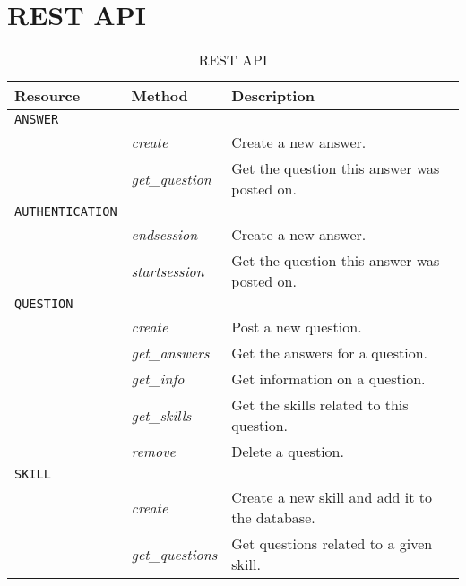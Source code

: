 \chapter{REST API}\label{app:rest}

\begin{table}
	\caption{REST API}\label{table:rest_api}
	
	\begin{center}
		\begin{tabular}{p{70px} | p{70px} | p{210px}}
				\hline
				\hline
				\textbf{Resource} 		& \textbf{Method}					&	\textbf{Description} 	\\
				\hline
				\hline
				\texttt{ANSWER}				& 												&	\\
				\hline
															& \emph{create}						& Create a new answer. \\
															& \emph{get\_question}		& Get the question this answer was posted on. \\
				\hline
				\texttt{AUTHENTICATION}		& 												&	\\
				\hline
															& \emph{endsession}				& Create a new answer. \\
															& \emph{startsession}			& Get the question this answer was posted on. \\
				\hline
				\texttt{QUESTION}			& 												& \\
				\hline
															& \emph{create}						& Post a new question. \\
															& \emph{get\_answers}			& Get the answers for a question. \\
															& \emph{get\_info}				& Get information on a question. \\
															& \emph{get\_skills}			& Get the skills related to this question. \\
															& \emph{remove}						& Delete a question. \\
				\hline
				\texttt{SKILL}				& 												& \\
				\hline
															& \emph{create}						& Create a new skill and add it to the database. \\
															& \emph{get\_questions}		& Get questions related to a given skill. \\

\end{tabular}
\end{center}
\end{table}
